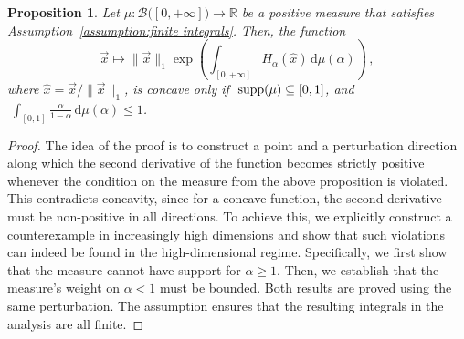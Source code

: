 \documentclass[aps,pra,11pt,onecolumn,nofootinbib,tightenlines]{revtex4-2}
\newtheorem{proposition}[theorem]{Proposition}
\theoremstyle{definition}
\def \d {\mathrm{d}}
\newcommand{\mc}[1]{\mathcal{#1}}
\newcommand{\mb}[1]{\mathbb{#1}}
\begin{document}
\begin{proposition}
\label{prop: first prop measure}
Let $\mu:\mc B\big([0,+\infty]\big)\to\mb R$ be a positive measure that satisfies Assumption~\ref{assumption:finite integrals}. Then, the function
\begin{equation}
    \vec{x} \longmapsto \|\vec{x}\|_1 \exp\left( \int_{[0,+\infty]} H_\alpha(\hat{x}) \,\d\mu(\alpha) \right) \,,
\end{equation}
where $\hat{x} = \vec{x}/\|\vec{x}\|_1$,
    is concave only if $\;\textup{supp}(\mu) \subseteq [0,1]$, and $\;\displaystyle\int_{[0,1]} \frac{\alpha}{1 - \alpha} \, \mathrm{d}\mu(\alpha) \leq 1$.
\end{proposition}
\begin{proof}
The idea of the proof is to construct a point and a perturbation direction along which the second derivative of the function becomes strictly positive whenever the condition on the measure from the above proposition is violated. This contradicts concavity, since for a concave function, the second derivative must be non-positive in all directions. To achieve this, we explicitly construct a counterexample in increasingly high dimensions and show that such violations can indeed be found in the high-dimensional regime. Specifically, we first show that the measure cannot have support for $\alpha \geq 1$. Then, we establish that the measure’s weight on $\alpha < 1$ must be bounded. Both results are proved using the same perturbation. The assumption ensures that the resulting integrals in the analysis are all finite.


\end{proof}
\end{document}
